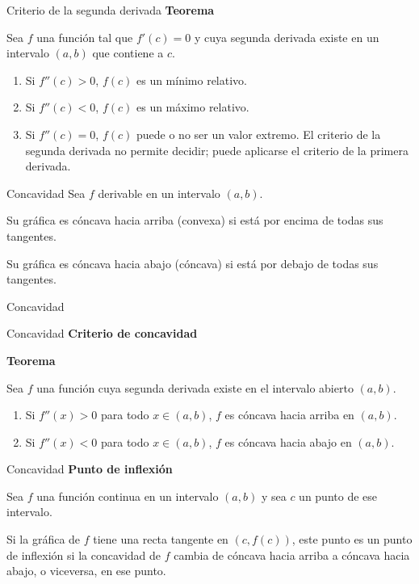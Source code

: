 \documentclass[original_version/main.tex]{subfiles}
\begin{document}
\begin{frame}{Criterio de la segunda derivada}
\small\textbf{Teorema}\par Sea $f$ una función tal que $f'(c)=0$ y cuya segunda derivada existe en un intervalo $(a,b)$ que contiene a $c$.
\begin{enumerate}
\item Si $f''(c)>0$, $f(c)$ es un mínimo relativo.
\item Si $f''(c)<0$, $f(c)$ es un máximo relativo.
\item Si $f''(c)=0$, $f(c)$ puede o no ser un valor extremo. El criterio de la segunda derivada no permite decidir; puede aplicarse el criterio de la primera derivada.
\end{enumerate}
\end{frame}
\begin{frame}{Concavidad}
Sea $f$ derivable en un intervalo $(a,b)$.
\medskip

Su gráfica es cóncava hacia arriba (convexa) si está por encima de todas sus tangentes.
\medskip

Su gráfica es cóncava hacia abajo (cóncava) si está por debajo de todas sus tangentes.
\end{frame}
\begin{frame}{Concavidad}
\end{frame}
\begin{frame}{Concavidad}
\textbf{Criterio de concavidad}\par\medskip
\textbf{Teorema}\par Sea $f$ una función cuya segunda derivada existe en el intervalo abierto $(a,b)$.
\begin{enumerate}
\item Si $f''(x)>0$ para todo $x\in(a,b)$, $f$ es cóncava hacia arriba en $(a,b)$.
\item Si $f''(x)<0$ para todo $x\in(a,b)$, $f$ es cóncava hacia abajo en $(a,b)$.
\end{enumerate}
\end{frame}
\begin{frame}{Concavidad}
\textbf{Punto de inflexión}\par\medskip
Sea $f$ una función continua en un intervalo $(a,b)$ y sea $c$ un punto de ese intervalo.
\medskip

Si la gráfica de $f$ tiene una recta tangente en $(c,f(c))$, este punto es un punto de inflexión si la concavidad de $f$ cambia de cóncava hacia arriba a cóncava hacia abajo, o viceversa, en ese punto.
\end{frame}
\end{document}
